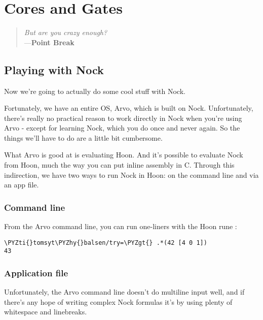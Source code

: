 \chapter{Cores and Gates}

\begin{quote}
\noindent \emph{But are you crazy enough?}
\medskip \\
---\textbf{Point Break}
\end{quote}

\section{Playing with Nock}

Now we're going to actually do some cool stuff with Nock.

Fortunately, we have an entire OS, Arvo, which is built on Nock.
Unfortunately, there's really no practical reason to work
directly in Nock when you're using Arvo - except for learning
Nock, which you do once and never again.  So the things we'll
have to do are a little bit cumbersome.

What Arvo is good at is evaluating Hoon.  And it's possible to
evaluate Nock from Hoon, much the way you can put inline assembly
in C.  Through this indirection, we have two ways to run Nock in
Hoon: on the command line and via an app file.

\subsection{Command line}

From the Arvo command line, you can run one-liners with the Hoon
rune :

\begin{framed_shaded}
\begin{Verbatim}[fontsize=\relsize{-2.5},fontseries=b,commandchars=\\\{\}]
\PYZti{}tomsyt\PYZhy{}balsen/try=\PYZgt{} .*(42 [4 0 1])
43
\end{Verbatim}
\end{framed_shaded}

\subsection{Application file}

Unfortunately, the Arvo command line doesn't do multiline input
well, and if there's any hope of writing complex Nock formulas
it's by using plenty of whitespace and linebreaks.

